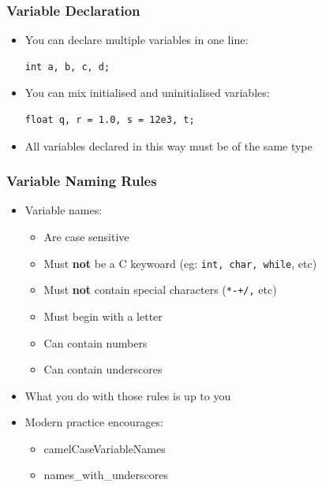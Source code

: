 \documentclass[14pt]{beamer}
\begin{document}
\begin{frame}[fragile]
\frametitle{Variable Declaration}
\begin{itemize}
\item You can declare multiple variables in one line:
\begin{lstlisting}[style=CStyle]
int a, b, c, d;
\end{lstlisting}
\item You can mix initialised and uninitialised variables:
\begin{lstlisting}[style=CStyle]
float q, r = 1.0, s = 12e3, t;
\end{lstlisting}
\item All variables declared in this way must be of the same type
\end{itemize}
\end{frame}

\begin{frame}
\frametitle{Variable Naming Rules}
\begin{itemize}
\item Variable names:
	\begin{itemize}
		\item Are case sensitive
		\item Must \textbf{not} be a C keywoard (eg: \texttt{int, char, while}, etc)
		\item Must \textbf{not} contain special characters (\texttt{*-+/,} etc)
		\item Must begin with a letter
		\item Can contain numbers
		\item Can contain underscores
		
	\end{itemize}
\item What you do with those rules is up to you
\item Modern practice encourages:
	\begin{itemize}
		\item camelCaseVariableNames
		\item names\_with\_underscores
	\end{itemize}
\end{itemize}
\end{frame}
\end{document}
